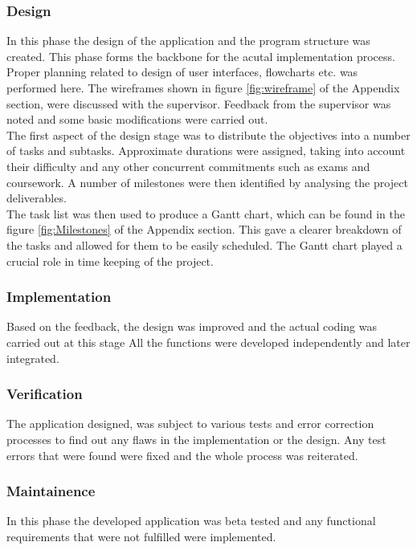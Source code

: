 \subsubsection{Design}
In this phase the design of the application and the program structure was created. This phase forms the backbone for the acutal implementation process. Proper planning related to design of user interfaces, flowcharts etc. was performed here. The wireframes shown in figure \ref{fig:wireframe} of the Appendix section, were discussed with the supervisor. Feedback from the supervisor was noted and some basic modifications were carried out.\\
The first aspect of the design stage was to distribute the objectives into a number of tasks and subtasks. Approximate durations were assigned, taking into account their difficulty and any other concurrent commitments such as exams and coursework. A number of milestones were then identified by analysing the project deliverables.\\
The task list was then used to produce a Gantt chart, which can be found in the figure \ref{fig:Milestones} of the Appendix section. This gave a clearer breakdown of the tasks and allowed for them to be easily scheduled. The Gantt chart played a crucial role in time keeping of the project.\\
\subsubsection{Implementation}
Based on the feedback, the design was improved and the actual coding was carried out at this stage All the functions were developed independently and later integrated.
\subsubsection{Verification}
The application designed, was subject to various tests and error correction processes to find out any flaws in the implementation or the design. Any test errors that were found were fixed and the whole process was reiterated.
\subsubsection{Maintainence}
In this phase the developed application was beta tested and any functional requirements that were not fulfilled were implemented.\\

